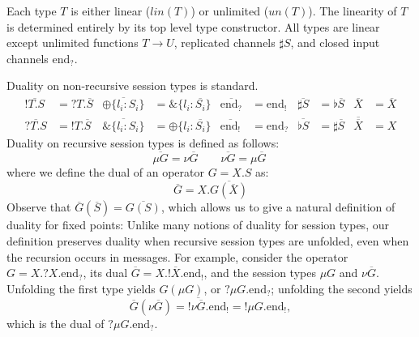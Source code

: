 \documentclass[orivec,envcountsame]{llncs}
\newcommand{\with}{\mathbin\binampersand}
\newcommand{\gvdual}[1]{\overline{#1}}
\newcommand{\gvout}[2]{{!#1.#2}}
\newcommand{\gvin}[2]{{?#1.#2}}
\newcommand{\uto}{\ensuremath{\rightarrow}}
\newcommand{\outterm}{\mathrm{end}_!}
\newcommand{\interm}{\mathrm{end}_?}
\newcommand{\gvserver}[1]{\flat #1}
\newcommand{\gvservice}[1]{\sharp #1}
\newcommand{\un}{un}
\newcommand{\lin}{lin}
\begin{document}
Each type $T$ is either linear ($\lin(T)$) or unlimited ($\un(T)$). The linearity of $T$ is
determined entirely by its top level type constructor.
%
All types are linear except unlimited functions $T \uto U$, replicated channels $\gvservice{S}$, and
closed input channels $\interm$.

Duality on non-recursive session types is standard.
\begin{align*}
\gvdual{\gvout{T}{S}} &= \gvin{T}{\gvdual{S}} &
  \gvdual{\oplus \{ l_i: S_i \}} &= \with \{ l_i : \gvdual{S_i} \} &
  \gvdual{\interm} &= \outterm &
  \gvdual{\gvservice{S}} &= \gvserver{\gvdual{S}} &
  \gvdual{X} &= \gvdual{X} \\
\gvdual{\gvin{T}{S}} &= \gvout{T}{\gvdual{S}} &
  \gvdual{\with \{ l_i: S_i \}} &= \oplus \{ l_i : \gvdual{S_i} \} &
  \gvdual{\outterm} &= \interm &
  \gvdual{\gvserver{S}} &= \gvservice{\gvdual{S}} &
  \gvdual{\gvdual{X}} &= X
\end{align*}%
Duality on recursive session types is defined as follows:
\[
\gvdual{\mu G} = \nu \gvdual{G} \qquad \gvdual{\nu G} = \mu \gvdual{G} \
\]%
where we define the dual of an operator $G = X.S$ as:
\[
\gvdual{G} = X.\gvdual{G(\gvdual{X})}
\]%
%
Observe that $\gvdual{G}(\gvdual{S}) = \gvdual{G(S)}$, which allows us to
give a natural definition of duality for fixed points:
%
Unlike many notions of duality for session types, our definition preserves duality when recursive
session types are unfolded, even when the recursion occurs in messages.  For example, consider the
operator $G = X.\gvin{X}{\interm}$, its dual $\gvdual{G} = X.\gvout{\gvdual{X}}{\outterm}$, and the
session types $\mu G$ and $\nu \gvdual{G}$.  Unfolding the first type yields $G(\mu G)$, or
$\gvin{\mu G}{\interm}$; unfolding the second yields
\[
  \gvdual{G}(\nu \gvdual{G}) = \gvout{\gvdual{\nu \gvdual{G}}}{\outterm} = \gvout{\mu G}{\outterm},
\]
which is the dual of $\gvin{\mu G}{\interm}$.
\end{document}

